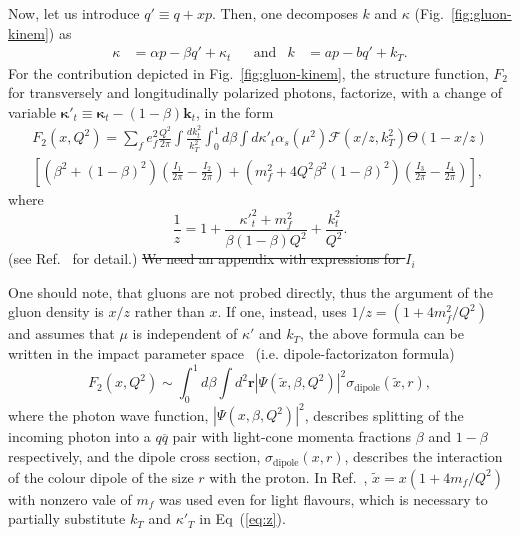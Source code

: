 \documentclass[11pt]{article}
\numberwithin{equation}{section}
\numberwithin{table}{section}
\numberwithin{figure}{section}
\begin{document}
Now, let us introduce $q'\equiv q+x p$. 
Then, one  decomposes $k$ and $\kappa$ (Fig.~\ref{fig:gluon-kinem}) as
\begin{align}
    \kappa&=\alpha p-\beta q'+\kappa_t&&\mathrm{and}& k&=a p- bq'+k_T.
\end{align}
For the contribution depicted in Fig.~\ref{fig:gluon-kinem}, the structure function, $F_2$ for transversely and longitudinally polarized photons, factorize, with a change of variable  ${\boldsymbol{\kappa}'}_t\equiv{\boldsymbol{\kappa}_t}-(1-\beta)\mathbf{k}_t$, in the form~\cite{ Kimber:2001uaa,Kwiecinski:1997ee}
\begin{multline}
	F_2(x,Q^2)=\sum_f e_f^2 \frac{Q^2}{2\pi}\int\frac{dk^2_t}{k_T^2}\int^1_0d\beta\int d{\kappa'}_t\alpha_s(\mu^2) \mathcal{F}(x/z,k_T^2)\Theta(1-x/z)\\
	\left[\left(\beta^2+(1-\beta)^2\right)\left(\frac{I_1}{2\pi}-\frac{I_2}{2\pi}\right)
	+\left(m_f^2+4Q^2\beta^2(1-\beta)^2\right)\left(\frac{I_3}{2\pi}-\frac{I_4}{2\pi}\right)\right],
	\label{eq:angle-integrated}
\end{multline}
where
\begin{equation}
	\frac{1}{z}=1+\frac{{\kappa'}^2_t+m_f^2}{\beta(1-\beta)Q^2}+\frac{k^2_t}{Q^2}.
	\label{eq:z}
\end{equation}
(see Ref.~\cite{ Kimber:2001uaa,Kwiecinski:1997ee} for detail.)
\sout{\color{red} We need an appendix with expressions for $I_i$}

One should note, that gluons are not probed directly, thus the argument of the gluon density is $x/z$ rather than $x$.
If one, instead, uses $ 1/z=\left(1+4 m_f^2/Q^2\right)$ and assumes that $\mu$ is independent of $\kappa'$ and $k_T$, 
the above formula can be written in the impact parameter space~\cite{Golec-Biernat:1998zce,Nikolaev:1990ja} (i.e. dipole-factorizaton formula)
\begin{equation}
F_2\left(x,Q^2\right)\sim\int^1_0d\beta \int d^2\mathbf{r}\left|\Psi\left(\tilde{x},\beta,Q^2\right)\right|^2\sigma_{\mathrm{dipole}}\left(\tilde{x},r\right),
\label{eq:dipole-factorization}
\end{equation}
where the photon wave function, $\left|\Psi\left(x,\beta,Q^2\right)\right|^2$, describes splitting of the incoming photon into a $q\overline{q}$ pair with light-cone momenta fractions $\beta$ and $1-\beta$ respectively, and the dipole cross section, $\sigma_{\mathrm{dipole}}\left(x,r\right)$, describes the interaction of the colour dipole of the size $r$ with the proton. In Ref.~\cite{Golec-Biernat:1998zce}, $\tilde{x}=x(1+4m_f/Q^2)$ with nonzero vale of $m_f$ was used even for light flavours, which is necessary to partially substitute $k_T$ and ${\kappa'}_T$ in Eq~(\ref{eq:z}). \\
\end{document}
